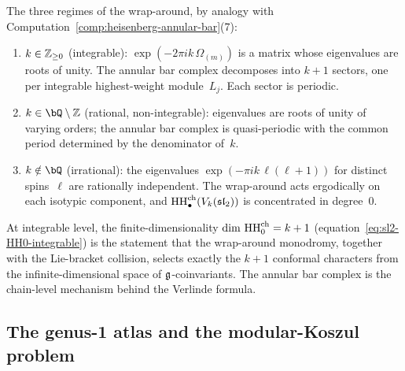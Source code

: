 \begin{computation}
The three regimes of the wrap-around, by analogy with
Computation~\ref{comp:heisenberg-annular-bar}(7):
\begin{enumerate}[label=\textup{(\roman*)}]
\item $k \in \mathbb{Z}_{\ge 0}$ (integrable):
 $\exp(-2\pi ik\,\Omega_{(m)})$ is a matrix
 whose eigenvalues are roots of unity.
 The annular bar complex decomposes into $k+1$
 sectors, one per integrable highest-weight
 module~$L_j$. Each sector is periodic.
\item $k \in \bQ \setminus \Z$ (rational,
 non-integrable): eigenvalues are roots of unity of
 varying orders; the annular bar complex is
 quasi-periodic with the common period determined
 by the denominator of~$k$.
\item $k \notin \bQ$ (irrational): the eigenvalues
 $\exp(-\pi ik\,\ell(\ell+1))$ for distinct spins~$\ell$
 are rationally independent. The wrap-around acts
 ergodically on each isotypic component,
 and $\operatorname{HH}^{\mathrm{ch}}_\bullet(V_k(\mathfrak{sl}_2))$
 is concentrated in degree~$0$.
\end{enumerate}

At integrable level, the finite-dimensionality
$\dim\,\operatorname{HH}_0^{\mathrm{ch}} = k+1$
(equation~\eqref{eq:sl2-HH0-integrable}) is the
statement that the wrap-around monodromy, together with
the Lie-bracket collision, selects exactly the $k+1$
conformal characters from the infinite-dimensional
space of $\mathfrak{g}$-coinvariants. The annular bar complex
is the chain-level mechanism behind the Verlinde formula.
\end{computation}


\subsection{The genus-1 atlas and the modular-Koszul problem}%
\label{subsec:genus1-atlas-table}

